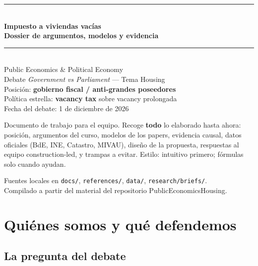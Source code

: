 \documentclass[11pt,a4paper]{report}
\begin{document}
\begin{titlepage}
\raggedright
\vspace*{1.5cm}
{\color{azulmedio}\rule{\textwidth}{2pt}}\\[0.6cm]
{\fontsize{28}{34}\selectfont\bfseries\color{azuloscuro}
  Impuesto a viviendas vac\'ias\\[0.2cm]
  Dossier de argumentos, modelos y evidencia}\\[0.5cm]
{\color{azulmedio}\rule{\textwidth}{1.2pt}}\\[1.2cm]
{\Large\color{azuloscuro}
  Public Economics \& Political Economy\\[0.3cm]
  Debate \emph{Government vs Parliament} --- Tema Housing}\\[0.8cm]
{\large
  Posici\'on: \textbf{gobierno fiscal / anti-grandes poseedores}\\[0.2cm]
  Pol\'itica estrella: \textbf{vacancy tax} sobre vacancy prolongada\\[0.2cm]
  Fecha del debate: 1 de diciembre de 2026}\\[1.5cm]
\begin{tcolorbox}[colback=fondosuave, colframe=azulmedio, boxrule=0.5pt, arc=2pt]
  Documento de trabajo para el equipo. Recoge \textbf{todo} lo elaborado hasta ahora:
  posici\'on, argumentos del curso, modelos de los papers, evidencia causal,
  datos oficiales (BdE, INE, Catastro, MIVAU), dise\~no de la propuesta,
  respuestas al equipo construction-led, y trampas a evitar.
  Estilo: intuitivo primero; f\'ormulas solo cuando ayudan.
\end{tcolorbox}
\vfill
{\small\color{azulmedio}
  Fuentes locales en \texttt{docs/}, \texttt{references/}, \texttt{data/}, \texttt{research/briefs/}.\\
  Compilado a partir del material del repositorio PublicEconomicsHousing.}
\end{titlepage}

\tableofcontents
\newpage

\chapter{Qui\'enes somos y qu\'e defendemos}
\label{ch:posicion}

\section{La pregunta del debate}
\end{document}
